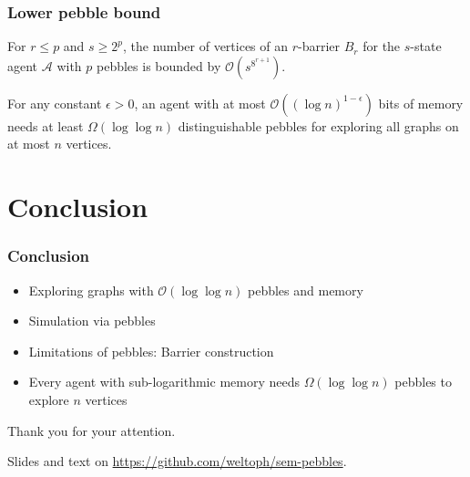 \documentclass{beamer}
\begin{document}
\begin{frame}
  \frametitle{Lower pebble bound}
  \begin{mdframed}
    \begin{theorem}
      For $r\leq p$ and $s\geq 2^{p}$, the number of vertices of an $r$-barrier
      $B_{r}$ for the $s$-state agent $\mathcal{A}$ with $p$ pebbles is bounded
      by $\mathcal{O}(s^{8^{r+1}})$.
    \end{theorem}
  \end{mdframed}
  \begin{center}
  \end{center}
  \begin{mdframed}
    \begin{theorem}
      For any constant $\epsilon > 0$, an agent with at most
      $\mathcal{O}((\log n)^{1-\epsilon})$ bits of memory needs at least
      $\Omega(\log\log n)$ distinguishable pebbles for exploring all
      graphs on at most $n$ vertices.
    \end{theorem}
  \end{mdframed}
\end{frame}

\section{Conclusion}
\begin{frame}
  \frametitle{Conclusion}
  \begin{itemize}
    \item Exploring graphs with $\mathcal{O}(\log\log n)$ pebbles and memory
    \item Simulation via pebbles
    \item Limitations of pebbles: Barrier construction
    \item Every agent with sub-logarithmic memory needs $\Omega(\log\log n)$
      pebbles to explore $n$ vertices
  \end{itemize}
\end{frame}

\begin{frame}
  \vspace{0.3\textheight}
  \begin{center}
    {\Huge Thank you for your attention.}
  \end{center}
  \vspace{0.35\textheight}
  Slides and text on \url{https://github.com/weltoph/sem-pebbles}.
\end{frame}
\end{document}
